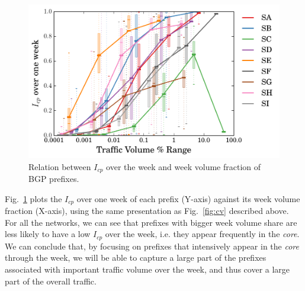 \begin{figure}[!tb]
\centering
\includegraphics[width=1\textwidth]{gfx/chap2/cp_bin.pdf}
\caption{Relation between $I_{cp}$ over the week and week volume fraction of BGP prefixes.}
\label{fig:cpi}
\end{figure}

Fig.~\ref{fig:cpi} plots the $I_{cp}$ over one week of each prefix (Y-axis) against its week volume fraction (X-axis), using the same presentation as Fig.~\ref{fig:cv} described above.
For all the networks, we can see that prefixes with bigger week volume share are less likely to have a low $I_{cp}$ over the week, i.e. they appear frequently in the \textit{core}.
We can conclude that, by focusing on prefixes that intensively appear in the \textit{core} through the week, we will be able to capture a large part of the prefixes associated with important traffic volume over the week, and thus cover a large part of the overall traffic.

